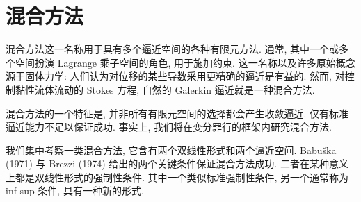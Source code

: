\section{混合方法}
\label{chap:ch12-mixed-methods}
\providecommand{\chvec}[1]{\underset{\sim}{#1}}
\providecommand{\chten}[1]{\underset{\approx}{#1}}

混合方法这一名称用于具有多个逼近空间的各种有限元方法. 通常, 其中一个或多个空间扮演 Lagrange 乘子空间的角色, 用于施加约束. 这一名称以及许多原始概念源于固体力学: 人们认为对位移的某些导数采用更精确的逼近是有益的. 然而, 对控制黏性流体流动的 Stokes 方程, 自然的 Galerkin 逼近就是一种混合方法.

混合方法的一个特征是, 并非所有有限元空间的选择都会产生收敛逼近. 仅有标准逼近能力不足以保证成功. 事实上, 我们将在变分罪行的框架内研究混合方法.

我们集中考察一类混合方法, 它含有两个双线性形式和两个逼近空间. Babuška (1971) 与 Brezzi (1974) 给出的两个关键条件保证混合方法成功. 二者在某种意义上都是双线性形式的强制性条件. 其中一个类似标准强制性条件, 另一个通常称为 inf-sup 条件, 具有一种新的形式.








